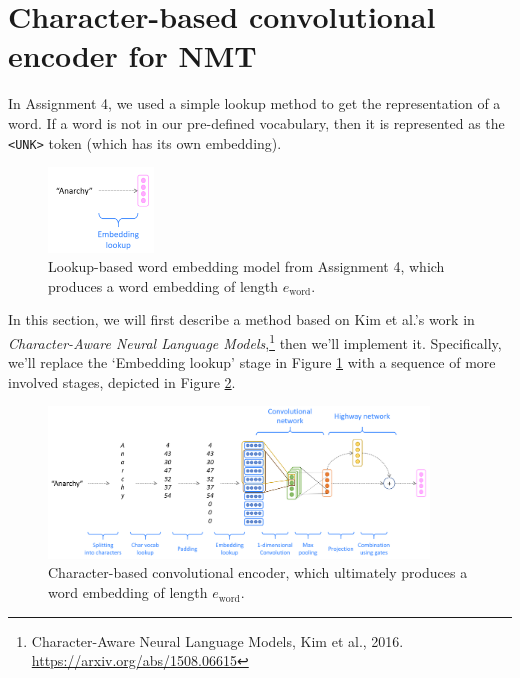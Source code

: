 \section{Character-based convolutional encoder for NMT}
\label{sec:char_enc}
In Assignment 4, we used a simple lookup method to get the representation of a word.
If a word is not in our pre-defined vocabulary, then it is represented as the \texttt{<UNK>} token (which has its own embedding).

\begin{figure}[h]
    \captionsetup{width=0.8\textwidth}
    \begin{center}
        \includegraphics[width=0.25\textwidth]{images/word-embedding.PNG}
        \caption{Lookup-based word embedding model from Assignment 4, which produces a word embedding of length $e_\text{word}$.}
        \label{fig:word-emb}
    \end{center}
\end{figure}

In this section, we will first describe a method based on Kim et al.'s work in \textit{Character-Aware Neural Language Models},\footnote{Character-Aware Neural Language Models, Kim et al., 2016. \url{https://arxiv.org/abs/1508.06615}} then we'll implement it. Specifically, we'll replace the `Embedding lookup' stage in Figure \ref{fig:word-emb} with a sequence of more involved stages, depicted in Figure \ref{fig:char-emb}.

\begin{figure}[h!]
    \captionsetup{width=0.8\textwidth}
    \begin{center}
        \includegraphics[width=0.9\textwidth]{images/embedding.PNG}
        \caption{Character-based convolutional encoder, which ultimately produces a word embedding of length $e_\text{word}$.}
        \label{fig:char-emb}
    \end{center}
\end{figure}
\newpage
